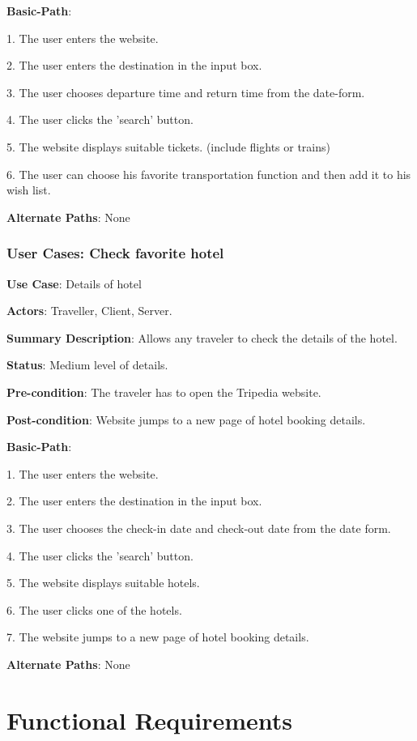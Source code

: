 \documentclass[conference]{IEEEtran}
\begin{document}
\textbf{Basic-Path}:

1. The user enters the website.

2. The user enters the destination in the input box.

3. The user chooses departure time and return time from the date-form.

4. The user clicks the 'search' button.

5. The website displays suitable tickets. (include flights or trains)

6. The user can choose his favorite transportation function and then add it to his wish list.

\textbf{Alternate Paths}: None

\subsubsection{User Cases: Check favorite hotel}

\textbf{ }

\textbf{Use Case}: Details of hotel

\textbf{Actors}: Traveller, Client, Server.

\textbf{Summary Description}: Allows any traveler to check the details of the hotel.

\textbf{Status}: Medium level of details.

\textbf{Pre-condition}: The traveler has to open the Tripedia website.

\textbf{Post-condition}: Website jumps to a new page of hotel booking details.

\textbf{Basic-Path}:

1. The user enters the website.

2. The user enters the destination in the input box.

3. The user chooses the check-in date and check-out date from the date form.

4. The user clicks the 'search' button.

5. The website displays suitable hotels.

6. The user clicks one of the hotels.

7. The website jumps to a new page of hotel booking details.

\textbf{Alternate Paths}: None

\section{Functional Requirements}
\end{document}

